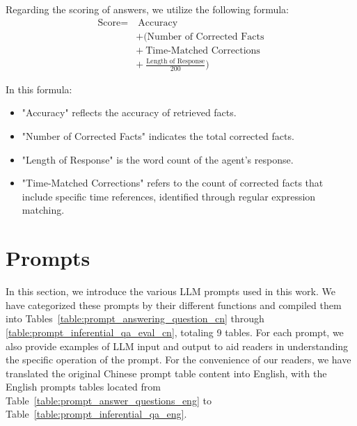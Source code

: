 \documentclass[11pt]{article}
\begin{document}
{Regarding the scoring of answers, we utilize the following formula:
\vspace{-0.6mm}
\begin{align*}
    \text{Score} = & \ \text{Accuracy} \\
                   & + (\text{Number of Corrected Facts} \\
                   & + \ \text{Time-Matched Corrections} \\
                   & + \ \frac{\text{Length of Response}}{200})
\end{align*}

In this formula:
\vspace{-1mm}
\begin{itemize}\setlength\itemsep{0em}
    \item "Accuracy" reflects the accuracy of retrieved facts.
    \item "Number of Corrected Facts" indicates the total corrected facts.
    \item "Length of Response" is the word count of the agent's response.
    \item "Time-Matched Corrections" refers to the count of corrected facts that include specific time references, identified through regular expression matching.
\end{itemize}






\section{Prompts}
\label{sec:prompts}
In this section, we introduce the various LLM prompts used in this work. We have categorized these prompts by their different functions and compiled them into Tables~\ref{table:prompt_answering_question_cn} through \ref{table:prompt_inferential_qa_eval_cn}, totaling 9 tables. For each prompt, we also provide examples of LLM input and output to aid readers in understanding the specific operation of the prompt. For the convenience of our readers, we have translated the original Chinese prompt table content into English, with the English prompts tables located from Table~\ref{table:prompt_answer_questions_eng} to Table~\ref{table:prompt_inferential_qa_eng}.

}
\end{document}
